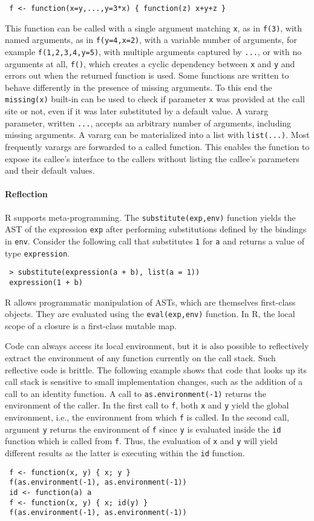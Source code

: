 \documentclass[screen,acmsmall]{acmart}
\newcommand{\code}[1]{\lstinline |#1|\xspace}
\renewcommand{\c}[1]{\lstinline |#1|\xspace}
\begin{document}
\begin{lstlisting}
 f <- function(x=y,...,y=3*x) { function(z) x+y+z }
\end{lstlisting}


This function can be called with a single argument matching \c x, as in
\c{f(3)}, with named arguments, as in \c{f(y=4,x=2)}, with a variable number of
arguments, for example \c{f(1,2,3,4,y=5)}, with multiple arguments captured by
\c{...}, or with no arguments at all, \c{f()}, which creates a cyclic dependency
between \c x and \c y and errors out when the returned function is used. Some
functions are written to behave differently in the presence of missing
arguments. To this end the \c{missing(x)} built-in can be used to check if
parameter \c{x} was provided at the call site or not, even if it was later
substituted by a default value. A vararg parameter, written \c{...}, accepts an
arbitrary number of arguments, including missing arguments. A vararg can be
materialized into a list with \c{list(...)}. Most frequently varargs are
forwarded to a called function. This enables the function to expose its callee's
interface to the callers without listing the callee's parameters and their
default values.

\paragraph{Reflection}
R supports meta-programming. The \c{substitute(exp,env)} function yields the AST
of the expression \c{exp} after performing substitutions defined by the bindings
in \c{env}. Consider the following call that substitutes \c 1 for \c a and
returns a value of type \c{expression}.

\begin{lstlisting}
 > substitute(expression(a + b), list(a = 1))
 expression(1 + b)
\end{lstlisting}

R allows programmatic manipulation of ASTs, which are themselves first-class
objects. They are evaluated using the \c{eval(exp,env)} function. In R, the
local scope of a closure is a first-class mutable map.

Code can always access its local environment, but it is also possible to
reflectively extract the environment of any function currently on the call
stack. Such reflective code is brittle. The following example shows that code
that looks up its call stack is sensitive to small implementation changes, such
as the addition of a call to an identity function. A call to
\code{as.environment(-1)} returns the environment of the caller. In the first
call to \code{f}, both \c x and \c y yield the global environment, i.e., the
environment from which \code{f} is called. In the second call, argument \c y
returns the environment of \c f since \c y is evaluated inside the \c{id}
function which is called from \c f. Thus, the evaluation of \c x and \c y will
yield different results as the latter is executing within the \c{id} function.
% 
\begin{lstlisting}
 f <- function(x, y) { x; y }
 f(as.environment(-1), as.environment(-1))
 id <- function(a) a
 f <- function(x, y) { x; id(y) }
 f(as.environment(-1), as.environment(-1))
\end{lstlisting}
\end{document}
